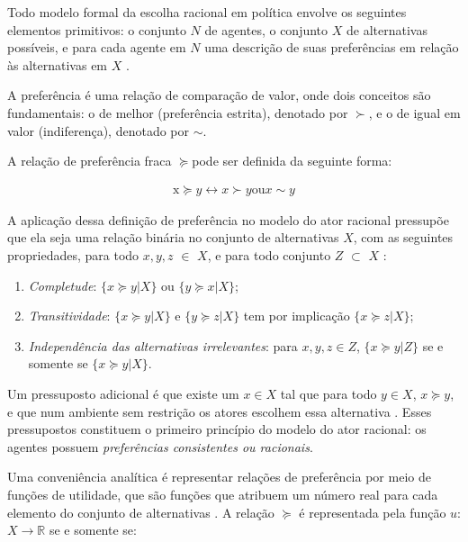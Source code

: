 Todo modelo formal da escolha racional em política envolve os seguintes
elementos primitivos: o conjunto $N$ de agentes, o conjunto \(X\) de
alternativas possíveis, e para cada agente em \(N\) uma descrição de suas
preferências em relação às alternativas em \(X\) \cite[p.
263]{austen1998social}.

A preferência é uma relação de comparação de valor, onde dois conceitos são
fundamentais: o de melhor (preferência estrita), denotado por \(\succ\),  e o de igual
em valor (indiferença), denotado por \(\sim\).

A relação de preferência fraca \( \succeq \)pode ser definida da seguinte forma:

\begin{align*}
  \text{x} \succeq y \leftrightarrow x \succ y \text{ou} x \sim y
\end{align*}

A aplicação dessa definição de preferência no modelo do ator racional pressupõe
que ela seja uma relação binária no conjunto de alternativas \(X\), com as
seguintes propriedades, para todo \(x,y,z\) $\in$ \(X\), e para todo conjunto
\(Z\) $\subset$ \(X\) \cite{gintis2016individuality,
  binmore2008rational}:



\begin{enumerate}
\item \textit{Completude}: \(\{ x \succeq y | X \}\) ou \(\{ y \succeq x | X \}\);
\item \textit{Transitividade}: \( \{x \succeq y | X\} \) e \(\{y \succeq z | X \}\) tem por
  implicação \(\{x \succeq z | X\}\);
 \item \textit{Independência das alternativas irrelevantes}: para \(x,y,z \in Z\),
   \(\{x \succeq y | Z \}\) se e somente se \(\{x \succeq y | X\}\).
\end{enumerate}

Um pressuposto adicional é que existe um \(x \in X\) tal que para todo \(y \in X\),
\(x \succeq y\), e que num ambiente sem restrição os atores escolhem essa alternativa
\cite{gintis2016individuality}. Esses pressupostos constituem o
primeiro princípio do modelo do ator racional: os agentes possuem
\textit{preferências consistentes ou racionais}.

Uma conveniência analítica é representar relações de preferência por meio de
funções de utilidade, que são funções que atribuem um número real para cada
elemento do conjunto de alternativas \cite{sep-preferences}. A relação \( \succeq\) é
representada pela função \(u\): \(X \longrightarrow \mathbb{R}\) se e somente se:

